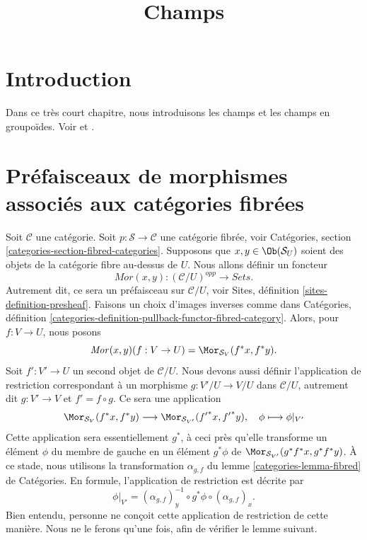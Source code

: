 

%


\title{Champs}


\maketitle

\label{section-phantom}

\tableofcontents

\section{Introduction}
\label{section-introduction}

\noindent
Dans ce très court chapitre, nous introduisons les champs et les
champs en groupoïdes. Voir \cite{DM} et \cite{Vis2}.


\section{Préfaisceaux de morphismes associés aux catégories fibrées}
\label{section-morphisms}

\noindent
Soit $\mathcal{C}$ une catégorie.
Soit $p : \mathcal{S} \to \mathcal{C}$ une catégorie fibrée,
voir Catégories, section \ref{categories-section-fibred-categories}.
Supposons que $x, y\in \Ob(\mathcal{S}_U)$ soient des
objets de la catégorie fibre au-dessus de $U$. Nous allons définir
un foncteur
$$
\mathit{Mor}(x, y) : (\mathcal{C}/U)^{opp} \longrightarrow \textit{Sets}.
$$
Autrement dit, ce sera un préfaisceau sur $\mathcal{C}/U$, voir
Sites, définition \ref{sites-definition-presheaf}.
Faisons un choix d'images inverses comme dans
Catégories,
définition \ref{categories-definition-pullback-functor-fibred-category}.
Alors, pour $f : V \to U$, nous posons
$$
\mathit{Mor}(x, y)(f : V \to U) =
\Mor_{\mathcal{S}_V}(f^\ast x, f^\ast y).
$$
Soit $f' : V' \to U$ un second objet de $\mathcal{C}/U$.
Nous devons aussi définir l'application de restriction correspondant à un
morphisme $g : V'/U  \to V/U$ dans $\mathcal{C}/U$,
autrement dit $g : V' \to V$ et $f' = f \circ g$.
Ce sera une application
$$
\Mor_{\mathcal{S}_V}(f^\ast x, f^\ast y)
\longrightarrow
\Mor_{\mathcal{S}_{V'}}({f'}^\ast x, {f'}^\ast y), \quad
\phi \longmapsto \phi|_{V'}
$$
Cette application sera essentiellement $g^\ast$, à ceci près qu'elle transforme
un élément $\phi$ du membre de gauche en un élément
$g^\ast \phi$
de $\Mor_{\mathcal{S}_{V'}}(g^\ast f^\ast x, g^\ast f^\ast y)$.
À ce stade, nous utilisons la transformation $\alpha_{g, f}$ du
lemme \ref{categories-lemma-fibred} de Catégories.
En formule, l'application de restriction est décrite par
$$
\phi|_{V'} =
(\alpha_{g, f})_y^{-1} \circ
g^\ast \phi \circ
(\alpha_{g, f})_x.
$$
Bien entendu, personne ne conçoit cette application de restriction de cette
manière. Nous ne le ferons qu'une fois, afin de vérifier le lemme suivant.

